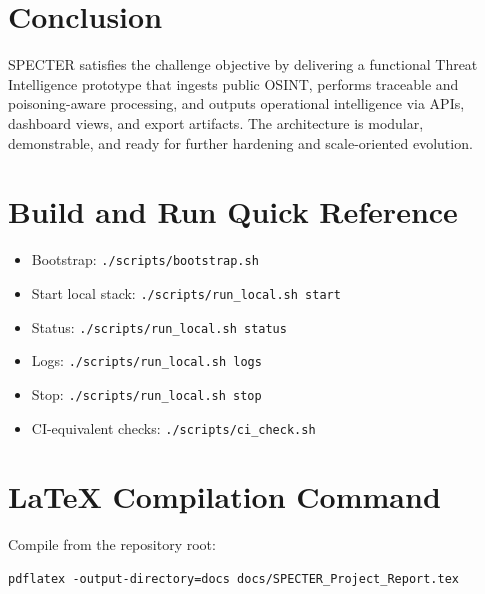 \documentclass[11pt,a4paper]{article}
\begin{document}
\section{Conclusion}
SPECTER satisfies the challenge objective by delivering a functional Threat Intelligence prototype that ingests public OSINT, performs traceable and poisoning-aware processing, and outputs operational intelligence via APIs, dashboard views, and export artifacts. The architecture is modular, demonstrable, and ready for further hardening and scale-oriented evolution.

\appendix
\section{Build and Run Quick Reference}
\begin{itemize}[leftmargin=1.5em]
  \item Bootstrap: \texttt{./scripts/bootstrap.sh}
  \item Start local stack: \texttt{./scripts/run\_local.sh start}
  \item Status: \texttt{./scripts/run\_local.sh status}
  \item Logs: \texttt{./scripts/run\_local.sh logs}
  \item Stop: \texttt{./scripts/run\_local.sh stop}
  \item CI-equivalent checks: \texttt{./scripts/ci\_check.sh}
\end{itemize}

\section{LaTeX Compilation Command}
Compile from the repository root:
\begin{verbatim}
pdflatex -output-directory=docs docs/SPECTER_Project_Report.tex
\end{verbatim}
\end{document}
